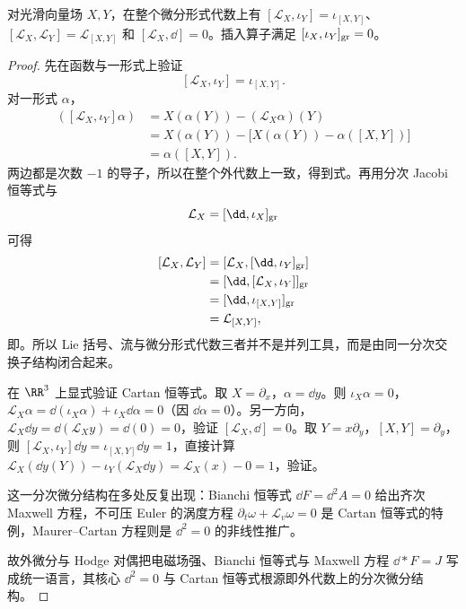 \begin{proposition}
对光滑向量场 $X,Y$，在整个微分形式代数上有 $[\mathcal L_X,\iota_Y]=\iota_{[X,Y]}$、$[\mathcal L_X,\mathcal L_Y]=\mathcal L_{[X,Y]}$ 和 $[\mathcal L_X,\dd]=0$。插入算子满足 $[\iota_X,\iota_Y]_{\rm gr}=0$。
\end{proposition}
\begin{proof}
先在函数与一形式上验证
\[
[\mathcal L_X,\iota_Y]=\iota_{[X,Y]}.
\]
对一形式 $\alpha$，
\[
\begin{aligned}
([\mathcal L_X,\iota_Y]\alpha)
&=X(\alpha(Y))-(\mathcal L_X\alpha)(Y)\\
&=X(\alpha(Y))-
\bigl[X(\alpha(Y))-\alpha([X,Y])\bigr]\\
&=\alpha([X,Y]).
\end{aligned}
\]
两边都是次数 $-1$ 的导子，所以在整个外代数上一致，得到式。再用分次 Jacobi 恒等式与
\[
\mathcal L_X=[\dd,\iota_X]_{\rm gr}
\]
可得
\[
\begin{aligned}
[\mathcal L_X,\mathcal L_Y]
&=[\mathcal L_X,[\dd,\iota_Y]_{\rm gr}]\\
&=[\dd,[\mathcal L_X,\iota_Y]]_{\rm gr}\\
&=[\dd,\iota_{[X,Y]}]_{\rm gr}\\
&=\mathcal L_{[X,Y]},
\end{aligned}
\]
即。所以 Lie 括号、流与微分形式代数三者并不是并列工具，而是由同一分次交换子结构闭合起来。

在 $\RR^3$ 上显式验证 Cartan 恒等式。取 $X=\partial_x$，$\alpha=\dd y$。则 $\iota_X\alpha=0$，$\mathcal L_X\alpha=\dd(\iota_X\alpha)+\iota_X\dd\alpha=0$（因 $\dd\alpha=0$）。另一方向，$\mathcal L_X\dd y=\dd(\mathcal L_X y)=\dd(0)=0$，验证 $[\mathcal L_X,\dd]=0$。取 $Y=x\partial_y$，$[X,Y]=\partial_y$，则 $[\mathcal L_X,\iota_Y]\dd y=\iota_{[X,Y]}\dd y=1$，直接计算 $\mathcal L_X(\dd y(Y))-\iota_Y(\mathcal L_X\dd y)=\mathcal L_X(x)-0=1$，验证。

这一分次微分结构在多处反复出现：Bianchi 恒等式 $\dd F=\dd^2A=0$ 给出齐次 Maxwell 方程，不可压 Euler 的涡度方程 $\partial_t\omega+\mathcal L_v\omega=0$ 是 Cartan 恒等式的特例，Maurer--Cartan 方程则是 $\dd^2=0$ 的非线性推广。

故外微分与 Hodge 对偶把电磁场强、Bianchi 恒等式与 Maxwell 方程 $\dd *F=J$ 写成统一语言，其核心 $\dd^2=0$ 与 Cartan 恒等式根源即外代数上的分次微分结构。
\end{proof}

